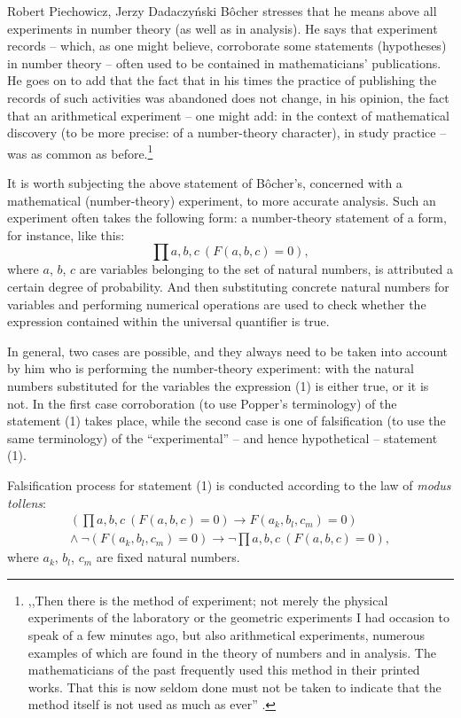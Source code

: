 \begin{artengenv}{Robert Piechowicz, Jerzy Dadaczyński}
Bôcher stresses that he means above all experiments in number theory (as well as in analysis). He says that experiment records -- which, as one might believe, corroborate some statements (hypotheses) in number theory -- often used to be contained in mathematicians' publications. He goes on to add that the fact that in his times the practice of publishing the records of such activities was abandoned does not change, in his opinion, the fact that an arithmetical experiment -- one might add: in the context of mathematical discovery (to be more precise: of a number-theory character), in study practice -- was as common as before.\footnote{,,Then there is the method of experiment; not merely the physical experiments of the laboratory or the geometric experiments I had occasion to speak of a few minutes ago, but also arithmetical experiments, numerous examples of which are found in the theory of numbers and in analysis. The mathematicians of the past frequently used this method in their printed works. That this is now seldom done must not be taken to indicate that the method itself is not used as much as ever''
\parencite[][p.134]{bocher_fundamental_1904}.%
}

It is worth subjecting the above statement of Bôcher's, concerned with a mathematical (number-theory) experiment, to more accurate analysis. Such an experiment often takes the following form: a number-theory statement of a form, for instance, like this:
\begin{equation}
\prod a,b,c\ (F(a,b,c) = 0),
\end{equation}
where $a$, $b$, $c$ are variables belonging to the set of natural numbers, is attributed a certain degree of probability. And then substituting concrete natural numbers for variables and performing numerical operations are used to check whether the expression contained within the universal quantifier is true.

In general, two cases are possible, and they always need to be taken into account by him who is performing the number-theory experiment: with the natural numbers substituted for the variables the expression (1) is either true, or it is not. In the first case corroboration (to use Popper's terminology) of the statement (1) takes place, while the second case is one of falsification (to use the same terminology) of the ``experimental'' -- and hence hypothetical -- statement (1).

Falsification process for statement (1) is conducted according to the law of \textit{modus tollens}:
\begin{equation}
\begin{split}
(\prod a,b,c\ (F(a,b,c) = 0) \to F(a_{k}, b_{l}, c_{m}) = 0)\\
\land\ \neg (F(a_{k}, b_{l}, c_{m}) = 0)
\to \neg \prod a,b,c\ (F(a,b,c) = 0),
\end{split}
\end{equation}
where $a_{k}$, $b_{l}$, $c_{m}$ are fixed natural numbers.


\end{artengenv}

